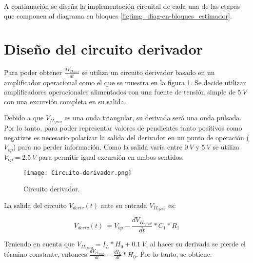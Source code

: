 A continuación se diseña la implementación circuital de cada una de las etapas que componen al diagrama en bloques \ref{fig:img_diag-en-bloques_estimador}.

{
	
}


\section{Diseño del circuito derivador}

Para poder obtener $\frac{dV_{IL_{feed}}}{dt}$ se utiliza un circuito derivador basado en un amplificador operacional como el que se muestra en la figura \ref{fig:img_Circuito-derivador}. Se decide utilizar amplificadores operacionales alimentados con una fuente de tensión simple de $5\:V$ con una excursión completa en su salida. 

Debido a que $V_{IL_{feed}}$ es una onda triangular, su derivada será una onda pulsada. Por lo tanto, para poder representar valores de pendientes tanto positivos como negativos es necesario polarizar la salida del derivador en un punto de operación ($V_{op}$) para no perder información. Como la salida varía entre $0\:V$ y $5\:V$ se utiliza $V_{op}=2.5\:V$ para permitir igual excursión en ambos sentidos.

\begin{figure}[H]
	\centering
	\texttt{[image: Circuito-derivador.png]}
	\caption{Circuito derivador.}
	\label{fig:img_Circuito-derivador}
\end{figure}


La salida del circuito $V_{deriv}(t)$ ante su entrada $V_{IL_{feed}}$ es:

\begin{equation} 
	V_{deriv}(t)\ = V_{op} - \frac{dV_{IL_{feed}}}{dt}*C_1*R_1
\end{equation}

Teniendo en cuenta que $V_{IL_{feed}}=I_L*H_0+0.1\:V$, al hacer su derivada se pierde el término constante, entonces $ \frac{dV_{IL_{feed}}}{dt}= \frac{dI_L}{dt}*H_0$. Por lo tanto, se obtiene:

